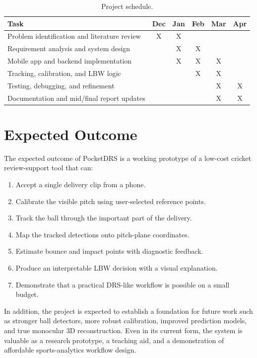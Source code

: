 \documentclass[12pt,a4paper]{article}
\begin{document}
\begin{table}[htbp]
\centering
\caption{Project schedule.}
\label{tab:gantt}
\begin{tabularx}{\textwidth}{@{}Xccccc@{}}
\toprule
\textbf{Task} & \textbf{Dec} & \textbf{Jan} & \textbf{Feb} & \textbf{Mar} & \textbf{Apr} \\
\midrule
Problem identification and literature review & X & X &  &  &  \\
Requirement analysis and system design &  & X & X &  &  \\
Mobile app and backend implementation &  & X & X & X &  \\
Tracking, calibration, and LBW logic &  &  & X & X &  \\
Testing, debugging, and refinement &  &  &  & X & X \\
Documentation and mid/final report updates &  &  &  & X & X \\
\bottomrule
\end{tabularx}
\end{table}

\section{Expected Outcome}

The expected outcome of PocketDRS is a working prototype of a low-cost cricket review-support tool that can:

\begin{enumerate}
    \item Accept a single delivery clip from a phone.
    \item Calibrate the visible pitch using user-selected reference points.
    \item Track the ball through the important part of the delivery.
    \item Map the tracked detections onto pitch-plane coordinates.
    \item Estimate bounce and impact points with diagnostic feedback.
    \item Produce an interpretable LBW decision with a visual explanation.
    \item Demonstrate that a practical DRS-like workflow is possible on a small budget.
\end{enumerate}

In addition, the project is expected to establish a foundation for future work such as stronger ball detectors, more robust calibration, improved prediction models, and true monocular 3D reconstruction. Even in its current form, the system is valuable as a research prototype, a teaching aid, and a demonstration of affordable sports-analytics workflow design.
\end{document}

